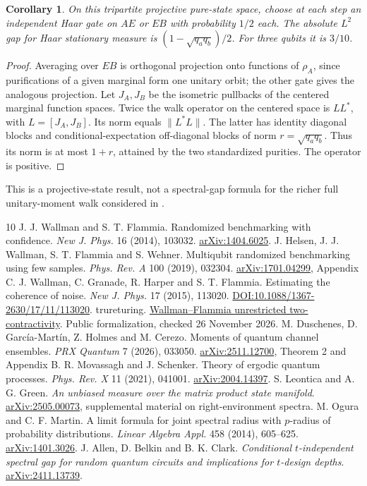 \documentclass[11pt]{article}
\newtheorem{corollary}[theorem]{Corollary}
\begin{document}
\begin{corollary}
On this tripartite projective pure-state space, choose at each step an independent Haar gate on $AE$ or $EB$ with probability $1/2$ each. The absolute $L^2$ gap for Haar stationary measure is $(1-\sqrt{q_aq_b})/2$. For three qubits it is $3/10$.
\end{corollary}
\begin{proof}
Averaging over $EB$ is orthogonal projection onto functions of $\rho_A$, since purifications of a given marginal form one unitary orbit; the other gate gives the analogous projection. Let $J_A,J_B$ be the isometric pullbacks of the centered marginal function spaces. Twice the walk operator on the centered space is $LL^*$, with $L=[J_A,J_B]$. Its norm equals $\|L^*L\|$. The latter has identity diagonal blocks and conditional-expectation off-diagonal blocks of norm $r=\sqrt{q_aq_b}$. Thus its norm is at most $1+r$, attained by the two standardized purities. The operator is positive.
\end{proof}
This is a projective-state result, not a spectral-gap formula for the richer full unitary-moment walk considered in \cite{brick}.

\begin{thebibliography}{10}\small
{} J. J. Wallman and S. T. Flammia. Randomized benchmarking with confidence. \emph{New J. Phys.} 16 (2014), 103032. \href{https://arxiv.org/abs/1404.6025}{arXiv:1404.6025}.
 J. Helsen, J. J. Wallman, S. T. Flammia and S. Wehner. Multiqubit randomized benchmarking using few samples. \emph{Phys. Rev. A} 100 (2019), 032304. \href{https://arxiv.org/abs/1701.04299}{arXiv:1701.04299}, Appendix C.
 J. Wallman, C. Granade, R. Harper and S. T. Flammia. Estimating the coherence of noise. \emph{New J. Phys.} 17 (2015), 113020. \href{https://doi.org/10.1088/1367-2630/17/11/113020}{DOI:10.1088/1367-2630/17/11/113020}.
 trureturing. \href{https://www.trureturing.org/research/wf1404/}{Wallman--Flammia unrestricted two-contractivity}. Public formalization, checked 26 November 2026.
 M. Duschenes, D. Garc\'ia-Mart\'in, Z. Holmes and M. Cerezo. Moments of quantum channel ensembles. \emph{PRX Quantum} 7 (2026), 033050. \href{https://arxiv.org/abs/2511.12700}{arXiv:2511.12700}, Theorem 2 and Appendix B.
 R. Movassagh and J. Schenker. Theory of ergodic quantum processes. \emph{Phys. Rev. X} 11 (2021), 041001. \href{https://arxiv.org/abs/2004.14397}{arXiv:2004.14397}.
 S. Leontica and A. G. Green. \emph{An unbiased measure over the matrix product state manifold}. \href{https://arxiv.org/abs/2505.00073}{arXiv:2505.00073}, supplemental material on right-environment spectra.
 M. Ogura and C. F. Martin. A limit formula for joint spectral radius with $p$-radius of probability distributions. \emph{Linear Algebra Appl.} 458 (2014), 605--625. \href{https://arxiv.org/abs/1401.3026}{arXiv:1401.3026}.
 J. Allen, D. Belkin and B. K. Clark. \emph{Conditional $t$-independent spectral gap for random quantum circuits and implications for $t$-design depths}. \href{https://arxiv.org/abs/2411.13739}{arXiv:2411.13739}.
\end{thebibliography}
\end{document}
